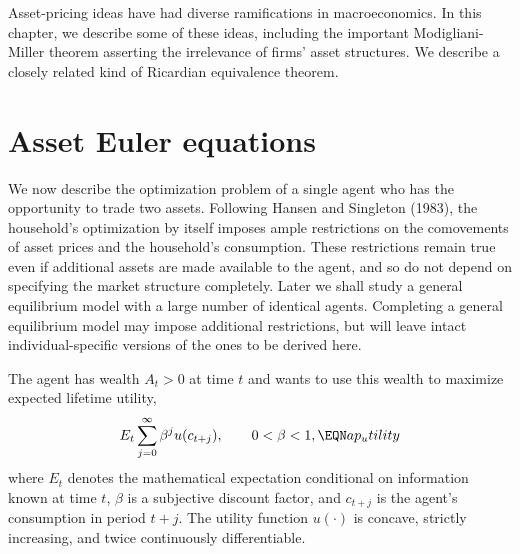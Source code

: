 %
 Asset-pricing ideas have had diverse ramifications in macroeconomics.
In this chapter, we describe some of these ideas, including
the important Modigliani-Miller theorem asserting the irrelevance
of firms' asset structures.  We describe a closely related
kind of Ricardian equivalence theorem.

\section{Asset Euler equations}

We now describe the optimization problem of a single agent who has the
opportunity to trade two assets.
 Following Hansen and Singleton (1983),
the household's optimization by itself imposes ample restrictions
on the comovements of asset prices and the household's consumption.
These restrictions remain true even if additional assets are
made available to the agent, and so do not depend on
specifying the market structure completely. Later we shall
study a general equilibrium model
with a large number of identical agents.
Completing a general equilibrium model may impose additional
restrictions, but will leave intact individual-specific
versions of  the ones to be derived here.
     

The agent has wealth $A_t > 0$ at time $t$ and wants to use
this wealth to maximize expected lifetime utility,
$$E_t\sum_{j=0}^\infty \be^j u(c_{t+j}),\qquad 0<\be <1,  \EQN ap_utility
$$
where $E_t$ denotes the mathematical expectation conditional on
information known at time $t$, $\beta$ is a subjective discount
factor, and $c_{t+j}$ is the agent's consumption in period $t+j$. The
utility function $u(\cdot)$ is concave, strictly increasing, and
twice continuously differentiable.

